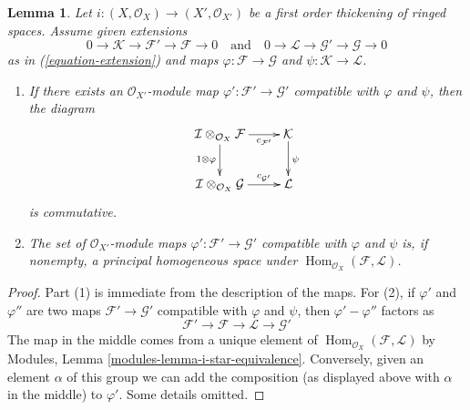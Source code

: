 \documentclass[10pt,a4paper]{amsart}
\theoremstyle{plain}
\newtheorem{lemma}[subsection]{Lemma}
\theoremstyle{definition}
\theoremstyle{remark}
\numberwithin{equation}{subsection}
\def\Hom{\mathop{\mathrm{Hom}}\nolimits}
\begin{document}
\begin{lemma}
\label{lemma-inf-map}
Let $i : (X, \mathcal{O}_X) \to (X', \mathcal{O}_{X'})$
be a first order thickening of ringed spaces. Assume given
extensions
$$
0 \to \mathcal{K} \to \mathcal{F}' \to \mathcal{F} \to 0
\quad\text{and}\quad
0 \to \mathcal{L} \to \mathcal{G}' \to \mathcal{G} \to 0
$$
as in (\ref{equation-extension})
and maps $\varphi : \mathcal{F} \to \mathcal{G}$ and
$\psi : \mathcal{K} \to \mathcal{L}$.
\begin{enumerate}
\item If there exists an $\mathcal{O}_{X'}$-module
map $\varphi' : \mathcal{F}' \to \mathcal{G}'$ compatible with $\varphi$
and $\psi$, then the diagram
$$
\xymatrix{
\mathcal{I} \otimes_{\mathcal{O}_X} \mathcal{F}
\ar[r]_-{c_{\mathcal{F}'}} \ar[d]_{1 \otimes \varphi} &
\mathcal{K} \ar[d]^\psi \\
\mathcal{I} \otimes_{\mathcal{O}_X} \mathcal{G}
\ar[r]^-{c_{\mathcal{G}'}} &
\mathcal{L}
}
$$
is commutative.
\item The set of $\mathcal{O}_{X'}$-module
maps $\varphi' : \mathcal{F}' \to \mathcal{G}'$ compatible with $\varphi$
and $\psi$ is, if nonempty, a principal homogeneous space under
$\Hom_{\mathcal{O}_X}(\mathcal{F}, \mathcal{L})$.
\end{enumerate}
\end{lemma}

\begin{proof}
Part (1) is immediate from the description of the maps.
For (2), if $\varphi'$ and $\varphi''$ are two maps
$\mathcal{F}' \to \mathcal{G}'$ compatible with $\varphi$
and $\psi$, then $\varphi' - \varphi''$ factors as
$$
\mathcal{F}' \to \mathcal{F} \to \mathcal{L} \to \mathcal{G}'
$$
The map in the middle comes from a unique element of
$\Hom_{\mathcal{O}_X}(\mathcal{F}, \mathcal{L})$ by
Modules, Lemma \ref{modules-lemma-i-star-equivalence}.
Conversely, given an element $\alpha$ of this group we can add the
composition (as displayed above with $\alpha$ in the middle)
to $\varphi'$. Some details omitted.
\end{proof}
\end{document}
